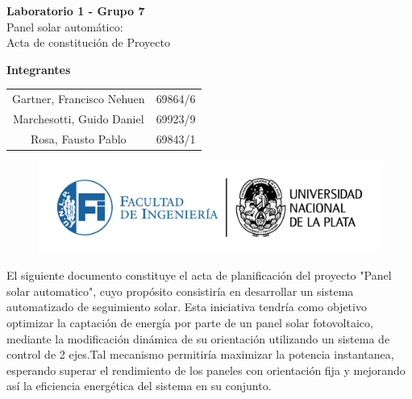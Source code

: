 \documentclass[a4paper,12pt]{article}
\begin{document}
\begin{titlepage}
    \begin{center}
        \vspace*{3cm}
        
        {\Huge \textbf{Laboratorio 1 - Grupo 7}}\\[1cm]
        {\LARGE Panel solar automático:\\ [0.5cm]Acta de constitución de Proyecto}\\[2cm]
        
        \vfill
        
        {\Large \textbf{Integrantes }}\\[.5cm]
        \large
        \begin{tabular}{c c}
            Gartner, Francisco Nehuen & 69864/6 \\
            Marchesotti, Guido Daniel & 69923/9 \\
            Rosa, Fausto Pablo & 69843/1 \\
        \end{tabular}
        
        \vspace{1cm}
        
        \begin{figure}[b]
            \centering
            \includegraphics[width=1\linewidth]{LOGOSFI-UNLP-color-01.png}
        \end{figure}
        
    \end{center}
\end{titlepage}


El siguiente documento constituye el acta de planificación del proyecto "Panel solar automatico", cuyo propósito consistiría en desarrollar un sistema automatizado de seguimiento solar. Esta iniciativa tendría como objetivo optimizar la captación de energía por parte de un panel solar fotovoltaico, mediante la modificación dinámica de su orientación utilizando un sistema de control de 2 ejes.Tal mecanismo permitiría maximizar la potencia instantanea, esperando superar el rendimiento de los paneles con orientación fija y mejorando así la eficiencia energética del sistema en su conjunto.
\end{document}
